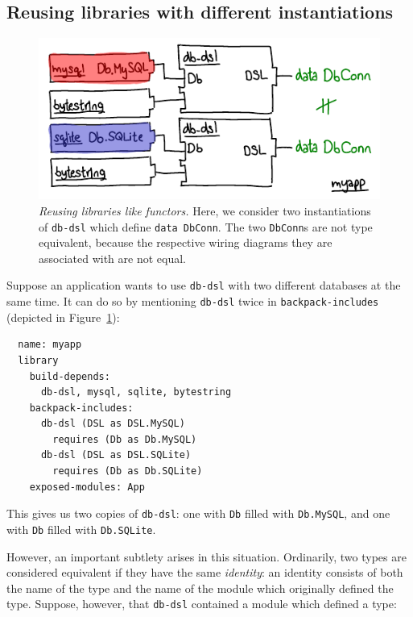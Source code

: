 \subsection{Reusing libraries with different instantiations}

\begin{figure}
\includegraphics{diagrams/reusing-packages-functors.pdf}
\caption{\emph{Reusing libraries like functors.}  Here, we consider
two instantiations of \texttt{db-dsl} which define \texttt{data DbConn}.
The two \texttt{DbConn}s are not type equivalent, because the respective
wiring diagrams they are associated with are not equal.}
\label{fig:reusing-packages-functors}
\end{figure}

Suppose an application wants to use \verb|db-dsl| with two different databases
at the same time. It can do so by mentioning \verb|db-dsl| twice in
\verb|backpack-includes| (depicted in Figure~\ref{fig:reusing-packages-functors}):

\begin{verbatim}
  name: myapp
  library
    build-depends:
      db-dsl, mysql, sqlite, bytestring
    backpack-includes:
      db-dsl (DSL as DSL.MySQL)
        requires (Db as Db.MySQL)
      db-dsl (DSL as DSL.SQLite)
        requires (Db as Db.SQLite)
    exposed-modules: App
\end{verbatim}
%
This gives us two copies of \verb|db-dsl|: one with \verb|Db| filled
with \verb|Db.MySQL|, and one with \verb|Db| filled with
\verb|Db.SQLite|.

However, an important subtlety arises in
this situation.  Ordinarily, two types are considered equivalent if they
have the same \emph{identity}: an identity consists of both the name of the
type and the name of the module which originally defined the type.
Suppose, however, that \verb|db-dsl| contained a module which defined
a type:

